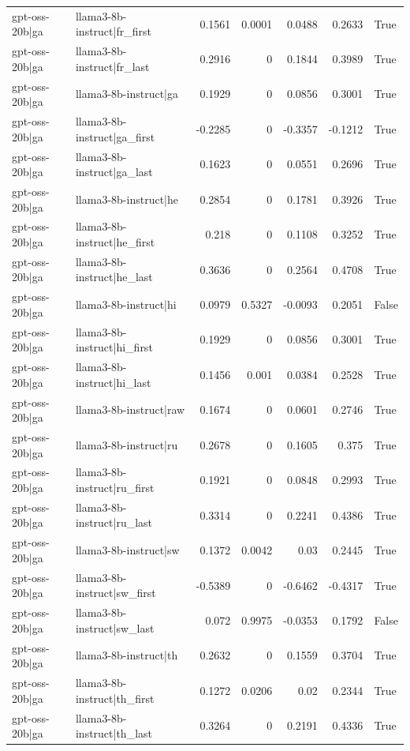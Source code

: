 \begin{table}
\begin{tabular}{l l r r r r l}
gpt-oss-20b|ga & llama3-8b-instruct|fr_first & 0.1561 & 0.0001 & 0.0488 & 0.2633 & True \\
gpt-oss-20b|ga & llama3-8b-instruct|fr_last & 0.2916 & 0 & 0.1844 & 0.3989 & True \\
gpt-oss-20b|ga & llama3-8b-instruct|ga & 0.1929 & 0 & 0.0856 & 0.3001 & True \\
gpt-oss-20b|ga & llama3-8b-instruct|ga_first & -0.2285 & 0 & -0.3357 & -0.1212 & True \\
gpt-oss-20b|ga & llama3-8b-instruct|ga_last & 0.1623 & 0 & 0.0551 & 0.2696 & True \\
gpt-oss-20b|ga & llama3-8b-instruct|he & 0.2854 & 0 & 0.1781 & 0.3926 & True \\
gpt-oss-20b|ga & llama3-8b-instruct|he_first & 0.218 & 0 & 0.1108 & 0.3252 & True \\
gpt-oss-20b|ga & llama3-8b-instruct|he_last & 0.3636 & 0 & 0.2564 & 0.4708 & True \\
gpt-oss-20b|ga & llama3-8b-instruct|hi & 0.0979 & 0.5327 & -0.0093 & 0.2051 & False \\
gpt-oss-20b|ga & llama3-8b-instruct|hi_first & 0.1929 & 0 & 0.0856 & 0.3001 & True \\
gpt-oss-20b|ga & llama3-8b-instruct|hi_last & 0.1456 & 0.001 & 0.0384 & 0.2528 & True \\
gpt-oss-20b|ga & llama3-8b-instruct|raw & 0.1674 & 0 & 0.0601 & 0.2746 & True \\
gpt-oss-20b|ga & llama3-8b-instruct|ru & 0.2678 & 0 & 0.1605 & 0.375 & True \\
gpt-oss-20b|ga & llama3-8b-instruct|ru_first & 0.1921 & 0 & 0.0848 & 0.2993 & True \\
gpt-oss-20b|ga & llama3-8b-instruct|ru_last & 0.3314 & 0 & 0.2241 & 0.4386 & True \\
gpt-oss-20b|ga & llama3-8b-instruct|sw & 0.1372 & 0.0042 & 0.03 & 0.2445 & True \\
gpt-oss-20b|ga & llama3-8b-instruct|sw_first & -0.5389 & 0 & -0.6462 & -0.4317 & True \\
gpt-oss-20b|ga & llama3-8b-instruct|sw_last & 0.072 & 0.9975 & -0.0353 & 0.1792 & False \\
gpt-oss-20b|ga & llama3-8b-instruct|th & 0.2632 & 0 & 0.1559 & 0.3704 & True \\
gpt-oss-20b|ga & llama3-8b-instruct|th_first & 0.1272 & 0.0206 & 0.02 & 0.2344 & True \\
gpt-oss-20b|ga & llama3-8b-instruct|th_last & 0.3264 & 0 & 0.2191 & 0.4336 & True \\

\end{tabular}
\end{table}
